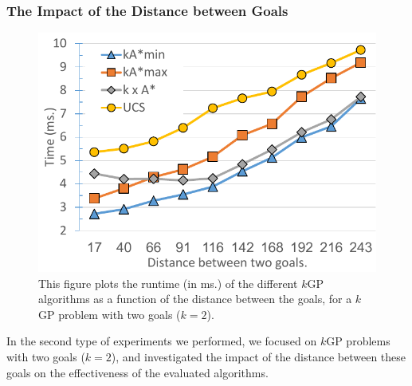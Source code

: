 \documentclass{aicom2e}
\newcommand{\kgs}{$k$GP}
\newcommand{\roni}[1]{\textbf{[RS:#1]}}
\begin{document}
\subsubsection{The Impact of the Distance between Goals}

\begin{figure}
    \includegraphics[width=\columnwidth]{G0-G1_cropped.pdf}
    \caption{This figure plots the runtime (in ms.) of the different \kgs{} algorithms as a function of the distance between the goals, for a \kgs{} problem with two goals ($k=2$).}
    \label{fig:2-goal}
\end{figure}



In the second type of experiments we performed, we focused on \kgs{} problems
with two goals ($k=2$), and investigated the impact of the distance between
these goals on the effectiveness of the evaluated algorithms.

\end{document}
